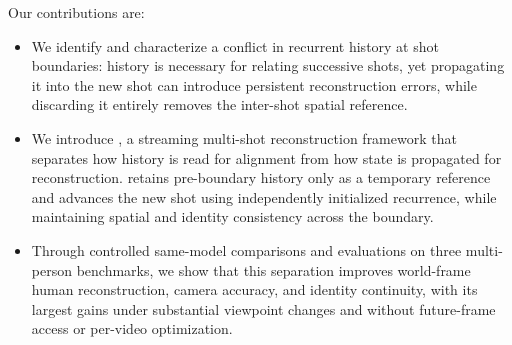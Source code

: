 Our contributions are:
\begin{itemize}
  \item We identify and characterize a conflict in recurrent history at shot
  boundaries: history is necessary for relating successive shots, yet
  propagating it into the new shot can introduce persistent reconstruction
  errors, while discarding it entirely removes the inter-shot spatial
  reference.

  \item We introduce \method{}, a streaming multi-shot reconstruction
  framework that separates how history is read for alignment from how state is
  propagated for reconstruction. \method{} retains pre-boundary history only
  as a temporary reference and advances the new shot using independently
  initialized recurrence, while maintaining spatial and identity consistency
  across the boundary.

  \item Through controlled same-model comparisons and evaluations on three
  multi-person benchmarks, we show that this separation improves world-frame
  human reconstruction, camera accuracy, and identity continuity, with its
  largest gains under substantial viewpoint changes and without future-frame
  access or per-video optimization.
\end{itemize}
